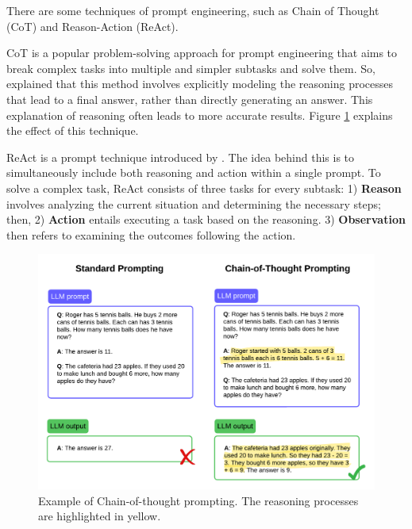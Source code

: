 

There are some techniques of prompt engineering, such as Chain of Thought (CoT) and Reason-Action (ReAct). 

CoT is a popular problem-solving approach for prompt engineering that aims to break complex tasks into multiple and simpler subtasks and solve them. So, \citet{wei_chain--thought_2023} explained that this method involves explicitly modeling the reasoning processes that lead to a final answer, rather than directly generating an answer. This explanation of reasoning often leads to more accurate results. Figure \ref{fig_cot} explains the effect of this technique.


ReAct is a prompt technique introduced by \citet{yao_react_2023}. The idea behind this is to simultaneously include both reasoning and action within a single prompt. To solve a complex task, ReAct consists of three tasks for every subtask: 1) \textbf{Reason} involves analyzing the current situation and determining the necessary steps; then, 2) \textbf{Action} entails executing a task based on the reasoning. 3) \textbf{Observation} then refers to examining the outcomes following the action.


\begin{figure}[ht]
    \includegraphics[width=14cm]{figs/chapter2/CoT.png}
    \centering
    \caption{Example of Chain-of-thought prompting. The reasoning processes are highlighted in yellow.}
    \label{fig_cot}
\end{figure}


